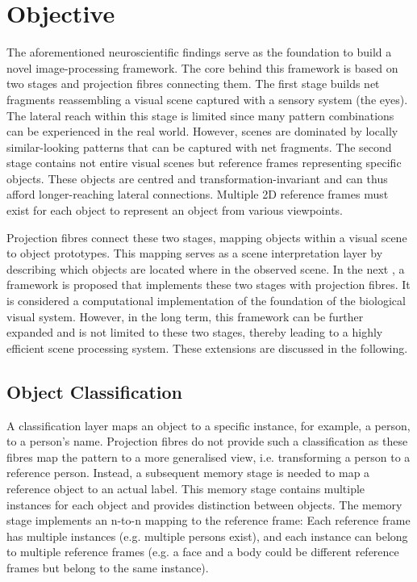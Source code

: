 \section{Objective}
The aforementioned neuroscientific findings serve as the foundation to build a novel image-processing framework.
The core behind this framework is based on two stages and projection fibres connecting them.
The first stage builds net fragments reassembling a visual scene captured with a sensory system (the eyes). The lateral reach within this stage is limited since many pattern combinations can be experienced in the real world. However, scenes are dominated by locally similar-looking patterns that can be captured with net fragments.
The second stage contains not entire visual scenes but reference frames representing specific objects. These objects are centred and transformation-invariant and can thus afford longer-reaching lateral connections.
Multiple 2D reference frames must exist for each object to represent an object from various viewpoints.

Projection fibres connect these two stages, mapping objects within a visual scene to object prototypes.
This mapping serves as a scene interpretation layer by describing which objects are located where in the observed scene.
In the next , a framework is proposed that implements these two stages with projection fibres.
It is considered a computational implementation of the foundation of the biological visual system.
However, in the long term, this framework can be further expanded and is not limited to these two stages, thereby leading to a highly efficient scene processing system.
These extensions are discussed in the following.

\subsection{Object Classification}
A classification layer maps an object to a specific instance, for example, a person, to a person's name. Projection fibres do not provide such a classification as these fibres map the pattern to a more generalised view, i.e. transforming a person to a reference person. Instead, a subsequent memory stage is needed to map a reference object to an actual label.
This memory stage contains multiple instances for each object and provides distinction between objects. The memory stage implements an n-to-n mapping to the reference frame: Each reference frame has multiple instances (e.g. multiple persons exist), and each instance can belong to multiple reference frames (e.g. a face and a body could be different reference frames but belong to the same instance).

